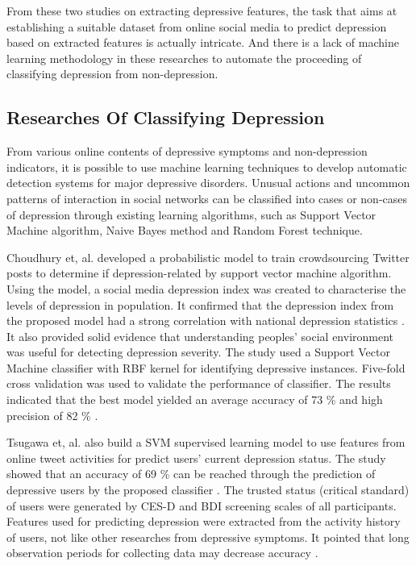 \documentclass[10pt,journal,compsoc]{IEEEtran}
\begin{document}
From these two studies on extracting depressive features, the task that aims at establishing a suitable dataset from online social media to predict depression based on extracted features is actually intricate. And there is a lack of machine learning methodology in these researches to automate the proceeding of classifying depression from non-depression.\\
\medskip
\subsection{Researches Of Classifying Depression}
From various online contents of depressive symptoms and non-depression indicators, it is possible to use machine learning techniques to develop automatic detection systems for major depressive disorders. Unusual actions and uncommon patterns of interaction \cite{Wongkoblap} in social networks can be classified into cases or non-cases of depression through existing learning algorithms,  such as Support Vector Machine algorithm, Naive Bayes method and Random Forest technique.

Choudhury et, al. \cite{DeChoudhury} developed a probabilistic model to train crowdsourcing Twitter posts to determine if depression-related by support vector machine algorithm. Using the model, a social media depression index was created to characterise the levels of depression in population. It confirmed that the depression index from the proposed model had a strong correlation with national depression statistics \cite{DeChoudhury}. It also provided solid evidence that understanding peoples' social environment was useful for detecting depression severity. The study used a Support Vector Machine classifier with RBF kernel for identifying depressive instances. Five-fold cross validation was used to validate the performance of classifier. The results indicated that the best model yielded an average accuracy of 73 \% and high precision of 82 \% \cite{DeChoudhury}. 

Tsugawa et, al. \cite{Tsugawa} also build a SVM supervised learning model to use features from online tweet activities for predict users' current depression status. The study showed that an accuracy of 69 \% can be reached through the prediction of depressive users by the proposed classifier \cite{Tsugawa}. The trusted status (critical standard) of users were generated by CES-D and BDI screening scales of all participants. Features used for predicting depression were extracted from the activity history of users, not like other researches from depressive symptoms. It pointed that long observation periods for collecting data may decrease accuracy \cite{Tsugawa}.  
\end{document}
